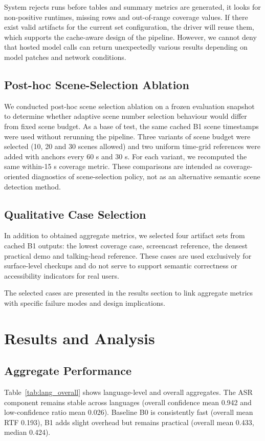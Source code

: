 ﻿\documentclass[conference]{IEEEtran}
\begin{document}
System rejects runs before tables and summary metrics are generated, it looks for non-positive runtimes, missing rows and out-of-range coverage values. If there exist valid artifacts for the current set configuration, the driver will reuse them, which supports the cache-aware design of the pipeline. However, we cannot deny that hosted model calls can return unexpectedly various results depending on model patches and network conditions.

\subsection{Post-hoc Scene-Selection Ablation}
We conducted post-hoc scene selection ablation on a frozen evaluation snapshot to determine whether adaptive scene number selection behaviour would differ from fixed scene budget. As a base of test, the same cached B1 scene timestamps were used without rerunning the pipeline. Three variants of scene budget were selected (10, 20 and 30 scenes allowed) and two uniform time-grid references were added with anchors every 60 s and 30 s. For each variant, we recomputed the same within-15 s coverage metric. These comparisons are intended as coverage-oriented diagnostics of scene-selection policy, not as an alternative semantic scene detection method.

\subsection{Qualitative Case Selection}
In addition to obtained aggregate metrics, we selected four artifact sets from cached B1 outputs: the lowest coverage case, screencast reference, the densest practical demo and talking-head reference. These cases are used exclusively for surface-level checkups and do not serve to support semantic correctness or accessibility indicators for real users.

The selected cases are presented in the results section to link aggregate metrics with specific failure modes and design implications.

\FloatBarrier
\section{Results and Analysis}
\subsection{Aggregate Performance}
Table~\ref{tab:lang_overall} shows language-level and overall aggregates. The ASR component remains stable across languages (overall confidence mean 0.942 and low-confidence ratio mean 0.026). Baseline B0 is consistently fast (overall mean RTF 0.193), B1 adds slight overhead but remains practical (overall mean 0.433, median 0.424).
\end{document}
